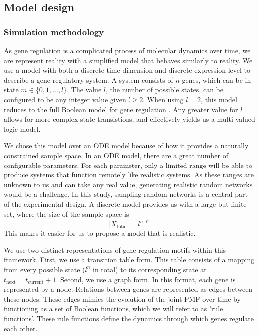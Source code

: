 \documentclass[../main.tex]{subfiles}
\begin{document}
\subsection{Model design}

\subsubsection{Simulation methodology}

As gene regulation is a complicated process of molecular dynamics over time, we are represent reality with a simplified model that behaves similarly to reality.
We use a model with both a discrete time-dimension and discrete expression level to describe a gene regulatory system.
A system consists of $n$ genes, which can be in state $m \in \{0, 1, ..., l\}$.
The value $l$, the number of possible states, can be configured to be any integer value given $l \ge 2$.
When using $l = 2$, this model reduces to the full Boolean model for gene regulation \cite{bolouri2002modeling}.
Any greater value for $l$ allows for more complex state transistions, and effectively yields us a multi-valued logic model.

We chose this model over an ODE model because of how it provides a naturally constrained sample space.
In an ODE model, there are a great number of configurable parameters.
For each parameter, only a limited range will be able to produce systems that function remotely like realistic systems.
As these ranges are unknown to us and can take any real value, generating realistic random networks would be a challenge.
In this study, sampling random networks is a central part of the experimental design.
A discrete model provides us with a large but finite set, where the size of the sample space is
%
\begin{equation}
|X_\mathrm{total}| = l^{n \cdot l^n}
\end{equation}
%
This makes it easier for us to propose a model that is realistic.

We use two distinct representations of gene regulation motifs within this framework.
First, we use a transition table form.
This table consists of a mapping from every possible state ($l^n$ in total) to its corresponding state at $t_\mathrm{next} = t_\mathrm{current} + 1$.
Second, we use a graph form.
In this format, each gene is represented by a node.
Relations between genes are represented as edges between these nodes.
These edges mimics the evolution of the joint PMF over time by functioning as a set of Boolean functions, which we will refer to as 'rule functions'.
These rule functions define the dynamics through which genes regulate each other.
\end{document}
